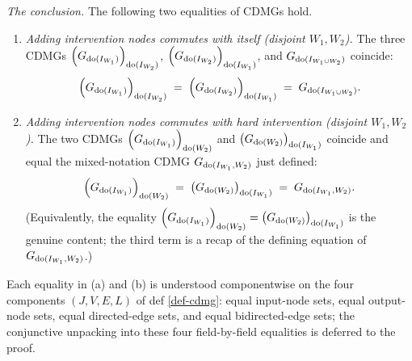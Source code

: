 \documentclass[main]{subfiles}
\begin{document}
\begin{Lem}
    \emph{The conclusion.} The following two equalities of CDMGs hold.
    \begin{enumerate}[label=(\alph*)]
        \item \emph{Adding intervention nodes commutes with itself (disjoint $W_1, W_2$).}
              The three CDMGs $\left ( G_{\operatorname{do}(I_{W_1})} \right )_{\operatorname{do}(I_{W_2})}$, $\left ( G_{\operatorname{do}(I_{W_2})} \right )_{\operatorname{do}(I_{W_1})}$, and $G_{\operatorname{do}(I_{W_1 \cup W_2})}$ coincide:
              \[ \left ( G_{\operatorname{do}(I_{W_1})} \right )_{\operatorname{do}(I_{W_2})} \;=\; \left ( G_{\operatorname{do}(I_{W_2})} \right )_{\operatorname{do}(I_{W_1})} \;=\; G_{\operatorname{do}(I_{W_1 \cup W_2})}. \]
        \item \emph{Adding intervention nodes commutes with hard intervention (disjoint $W_1, W_2$).}
              The two CDMGs $\left ( G_{\operatorname{do}(I_{W_1})} \right )_{\operatorname{do}(W_2)}$ and $\left ( G_{\operatorname{do}(W_2)} \right )_{\operatorname{do}(I_{W_1})}$ coincide and equal the mixed-notation CDMG $G_{\operatorname{do}(I_{W_1}, W_2)}$ just defined:
              \[ \left ( G_{\operatorname{do}(I_{W_1})} \right )_{\operatorname{do}(W_2)} \;=\; \left ( G_{\operatorname{do}(W_2)} \right )_{\operatorname{do}(I_{W_1})} \;=\; G_{\operatorname{do}(I_{W_1}, W_2)}. \]
              (Equivalently, the equality $\left ( G_{\operatorname{do}(I_{W_1})} \right )_{\operatorname{do}(W_2)} = \left ( G_{\operatorname{do}(W_2)} \right )_{\operatorname{do}(I_{W_1})}$ is the genuine content; the third term is a recap of the defining equation of $G_{\operatorname{do}(I_{W_1}, W_2)}$.)
    \end{enumerate}
    Each equality in (a) and (b) is understood componentwise on the four components $(J, V, E, L)$ of def \ref{def-cdmg}: equal input-node sets, equal output-node sets, equal directed-edge sets, and equal bidirected-edge sets; the conjunctive unpacking into these four field-by-field equalities is deferred to the proof.
\end{Lem}
\end{document}
